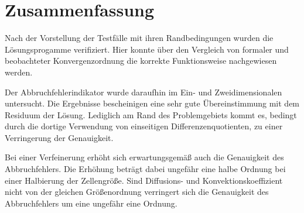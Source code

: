 \section{Zusammenfassung}
Nach der Vorstellung der Testfälle mit ihren Randbedingungen wurden
die Lösungsprogamme verifiziert. Hier konnte über den Vergleich von formaler
und beobachteter Konvergenzordnung die korrekte Funktionsweise nachgewiesen werden.

Der Abbruchfehlerindikator wurde daraufhin im Ein- und Zweidimensionalen untersucht.
Die Ergebnisse bescheinigen eine sehr gute Übereinstimmung mit dem Residuum
der Lösung. Lediglich am Rand des Problemgebiets kommt es, bedingt durch die dortige Verwendung von
einseitigen Differenzenquotienten, zu einer Verringerung der Genauigkeit.

Bei einer Verfeinerung erhöht sich erwartungsgemäß auch die Genauigkeit
des Abbruchfehlers. Die Erhöhung beträgt dabei ungefähr eine halbe Ordnung
bei einer Halbierung der Zellengröße. Sind Diffusions- und Konvektionskoeffizient
nicht von der gleichen Größenordnung verringert sich die Genauigkeit
des Abbruchfehlers um eine ungefähr eine Ordnung.



\clearpage
